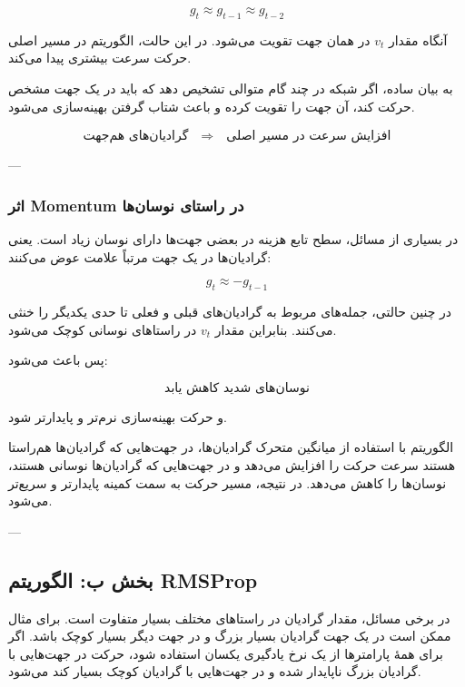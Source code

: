 \documentclass[12pt,a4paper]{article}
\begin{document}
\[
g_t \approx g_{t-1} \approx g_{t-2}
\]

آنگاه مقدار \(v_t\) در همان جهت تقویت می‌شود. در این حالت، الگوریتم در مسیر اصلی حرکت سرعت بیشتری پیدا می‌کند.

به بیان ساده، اگر شبکه در چند گام متوالی تشخیص دهد که باید در یک جهت مشخص حرکت کند،  آن جهت را تقویت کرده و باعث شتاب گرفتن بهینه‌سازی می‌شود.

\[
\text{گرادیان‌های هم‌جهت}
\quad \Longrightarrow \quad
\text{افزایش سرعت در مسیر اصلی}
\]

---

\subsubsection{اثر Momentum در راستای نوسان‌ها}

در بسیاری از مسائل، سطح تابع هزینه در بعضی جهت‌ها دارای نوسان زیاد است. یعنی گرادیان‌ها در یک جهت مرتباً علامت عوض می‌کنند:

\[
g_t \approx -g_{t-1}
\]

در چنین حالتی، جمله‌های مربوط به گرادیان‌های قبلی و فعلی تا حدی یکدیگر را خنثی می‌کنند. بنابراین مقدار \(v_t\) در راستاهای نوسانی کوچک می‌شود.

پس  باعث می‌شود:

\[
\text{نوسان‌های شدید کاهش یابد}
\]

و حرکت بهینه‌سازی نرم‌تر و پایدارتر شود.

\begin{tcolorbox}[
	colback=lightblue,
	colframe=mainblue,
	title=جمع‌بندی بخش Momentum
	]
	الگوریتم  با استفاده از میانگین متحرک گرادیان‌ها، در جهت‌هایی که گرادیان‌ها هم‌راستا هستند سرعت حرکت را افزایش می‌دهد و در جهت‌هایی که گرادیان‌ها نوسانی هستند، نوسان‌ها را کاهش می‌دهد. در نتیجه، مسیر حرکت به سمت کمینه پایدارتر و سریع‌تر می‌شود.
\end{tcolorbox}

---

\subsection{بخش ب: الگوریتم RMSProp}

در برخی مسائل، مقدار گرادیان در راستاهای مختلف بسیار متفاوت است. برای مثال ممکن است در یک جهت گرادیان بسیار بزرگ و در جهت دیگر بسیار کوچک باشد. اگر برای همهٔ پارامترها از یک نرخ یادگیری یکسان استفاده شود، حرکت در جهت‌هایی با گرادیان بزرگ ناپایدار شده و در جهت‌هایی با گرادیان کوچک بسیار کند می‌شود.
\end{document}
